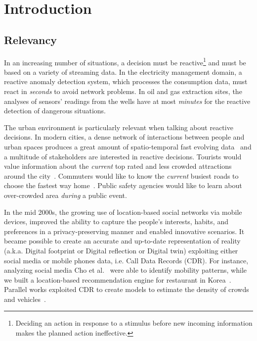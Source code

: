 \chapter{Introduction}\label{ch:intro}

\section{Relevancy}\label{sec:relevancy}
In an increasing number of situations, a decision must be reactive\footnote{Deciding an action in response to a stimulus before new incoming information makes the planned action ineffective.} and must be based on a variety of streaming data.
In the electricity management domain, a reactive anomaly detection system, which processes the consumption data, must react in \textit{seconds} to avoid network problems. In oil and gas extraction sites, the analyses of sensors' readings from the wells have at most \textit{minutes} for the reactive detection of dangerous situations.

The urban environment is particularly relevant when talking about reactive decisions. In modern cities, a dense network of interactions between people and urban spaces produces a great amount of spatio-temporal fast evolving data~\cite{kitchin2014real} and a multitude of stakeholders are interested in reactive decisions. 
Tourists would value information about the \textit{current} top rated and less crowded attractions around the city~\cite{DBLP:journals/ws/BalduiniCDVHLKT12}. Commuters would like to know the \textit{current} busiest roads to choose the fastest way home~\cite{DBLP:journals/ws/LecueTHTBST14}. Public safety agencies would like to learn about over-crowded area \textit{during} a public event.

In the mid 2000s, the growing use of location-based social networks via mobile devices, improved the ability to capture the people's interests, habits, and preferences in a privacy-preserving manner and enabled innovative scenarios.
It became possible to create an accurate and up-to-date representation of reality (a.k.a. Digital footprint or Digital reflection or Digital twin) exploiting either social media or mobile phones data, i.e. Call Data Records (CDR). 
For instance, analyzing social media Cho et al.~\cite{cho2011friendship} were able to identify mobility patterns, while we built a location-based recommendation engine for restaurant in Korea~\cite{DBLP:conf/semweb/BalduiniVDTPC13}.
Parallel works exploited CDR to create models to estimate the density of crowds and vehicles~\cite{eagle2006reality,becker2011tale,calabrese2011real}.

